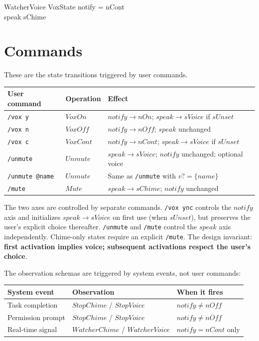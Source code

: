 \documentclass[a4paper,10pt,fleqn]{article}
\begin{document}
\begin{schema}{WatcherVoice}
  \Xi VoxState
  \where
  notify = nCont \\
  speak \neq sChime
\end{schema}

\section{Commands}

These are the state transitions triggered by user commands.

\begin{center}
\begin{tabular}{l|l|l}
\textbf{User command} & \textbf{Operation} & \textbf{Effect} \\
\hline
\texttt{/vox y}          & $VoxOn$   & $notify \to nOn$; $speak \to sVoice$ if $sUnset$ \\
\texttt{/vox n}          & $VoxOff$  & $notify \to nOff$; $speak$ unchanged \\
\texttt{/vox c}          & $VoxCont$ & $notify \to nCont$; $speak \to sVoice$ if $sUnset$ \\
\texttt{/unmute}         & $Unmute$  & $speak \to sVoice$; $notify$ unchanged; optional voice \\
\texttt{/unmute @name}   & $Unmute$  & Same as \texttt{/unmute} with $v? = \{name\}$ \\
\texttt{/mute}           & $Mute$    & $speak \to sChime$; $notify$ unchanged \\
\end{tabular}
\end{center}

The two axes are controlled by separate commands.
\texttt{/vox y\textbar n\textbar c} controls the $notify$ axis
and initializes $speak \to sVoice$ on first use (when $sUnset$),
but preserves the user's explicit choice thereafter.
\texttt{/unmute} and \texttt{/mute} control the $speak$ axis
independently. Chime-only states require an explicit
\texttt{/mute}. The design invariant: \textbf{first activation
implies voice; subsequent activations respect the user's choice}.

The observation schemas are triggered by system events, not
user commands:

\begin{center}
\begin{tabular}{l|l|l}
\textbf{System event} & \textbf{Observation} & \textbf{When it fires} \\
\hline
Task completion      & $StopChime$ / $StopVoice$       & $notify \neq nOff$ \\
Permission prompt    & $StopChime$ / $StopVoice$       & $notify \neq nOff$ \\
Real-time signal     & $WatcherChime$ / $WatcherVoice$ & $notify = nCont$ only \\
\end{tabular}
\end{center}
\end{document}
